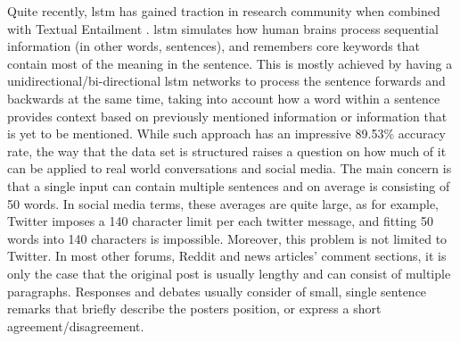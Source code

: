         Quite recently, \gls{lstm} has gained traction in research community when combined with Textual Entailment \autocite{Cocarascu2017IdentifyingAA}. \gls{lstm} simulates how human brains process sequential information (in other words, sentences), and remembers core keywords that contain most of the meaning in the sentence. This is mostly achieved by having a unidirectional/bi-directional \gls{lstm} networks to process the sentence forwards and backwards at the same time, taking into account how a word within a sentence provides context based on previously mentioned information or information that is yet to be mentioned. While such approach has an impressive 89.53\% accuracy rate, the way that the data set is structured raises a question on how much of it can be applied to real world conversations and social media. The main concern is that a single input can contain multiple sentences and on average is consisting of 50 words. In social media terms, these averages are quite large, as for example, Twitter imposes a 140 character limit per each twitter message, and fitting 50 words into 140 characters is impossible. Moreover, this problem is not limited to Twitter. In most other forums, Reddit and news articles' comment sections, it is only the case that the original post is usually lengthy and can consist of multiple paragraphs. Responses and debates usually consider of small, single sentence remarks that briefly describe the posters position, or express a short agreement/disagreement.